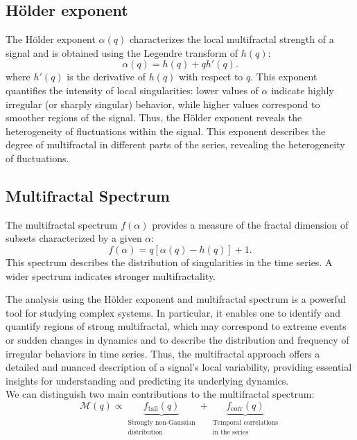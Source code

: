 \documentclass[11pt]{extarticle}
\begin{document}
\subsection{Hölder exponent}
The Hölder exponent $\alpha(q)$ characterizes the local multifractal strength of a signal and is obtained using the Legendre transform of $h(q)$:
\begin{equation}
\alpha(q) = h(q) + q h'(q).
\end{equation}
where $h'(q)$ is the derivative of $h(q)$ with respect to $q$. This exponent quantifies the intensity of local
singularities: lower values of $\alpha$ indicate highly irregular (or sharply singular) behavior, while higher
values correspond to smoother regions of the signal. Thus, the Hölder exponent reveals the heterogeneity of fluctuations within the signal.
This exponent describes the degree of multifractal in different parts of the series, revealing the heterogeneity of fluctuations.

\subsection{Multifractal Spectrum}
The multifractal spectrum $f(\alpha)$ provides a measure of the fractal dimension of subsets characterized by a given $\alpha$:
\begin{equation}
f(\alpha) = q [\alpha(q) - h(q)] + 1.
\end{equation}
This spectrum describes the distribution of singularities in the time series. A wider spectrum indicates stronger multifractality.

The analysis using the Hölder exponent and multifractal spectrum is a powerful tool for studying complex systems.
In particular, it enables one to identify and quantify regions of strong multifractal, which may correspond to extreme
events or sudden changes in dynamics and to describe the distribution and frequency of irregular behaviors in time series.
Thus, the multifractal approach offers a detailed and nuanced description of a signal's local variability, providing
essential insights for understanding and predicting its underlying dynamics. \\

We can distinguish two main contributions to the multifractal spectrum:
\[
\mathcal{M}(q) \propto
\underbrace{f_{\text{tail}}(q)}_{\substack{\text{Strongly non-Gaussian} \\ \text{distribution}}}
+
\underbrace{f_{\text{corr}}(q)}_{\substack{\text{Temporal correlations} \\ \text{in the series}}}
\]
\end{document}

